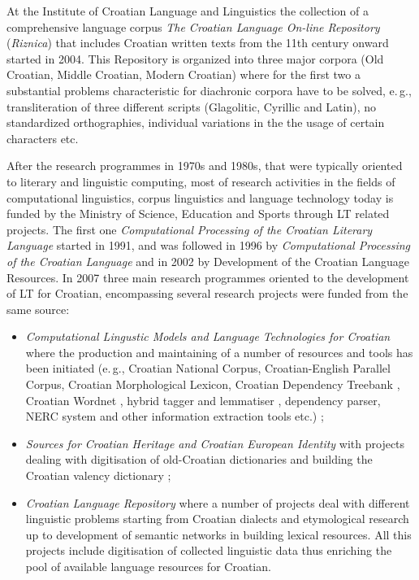 \begin{multicols}{2}
At the Institute of Croatian Language and Linguistics the collection of a comprehensive language corpus \emph{The Croatian Language On-line Repository} (\emph{Riznica})  \cite{str29, pro11} that includes Croatian written texts from the 11th century onward started in 2004. This Repository is organized into three major corpora (Old Croatian, Middle Croatian, Modern Croatian) where for the first two a substantial problems characteristic for diachronic corpora have to be solved, e.\,g., transliteration of three different scripts (Glagolitic, Cyrillic and Latin), no standardized orthographies, individual variations in the the usage of certain characters etc.

After the research programmes in 1970s and 1980s, that were typically oriented  to literary and linguistic computing, most of research activities in the fields of computational linguistics, corpus linguistics and language technology today is funded by the Ministry of Science, Education and Sports through LT related projects. The first one \emph{Computational Processing of the Croatian Literary Language} started in 1991, and was followed in 1996 by \emph{Computational Processing of the Croatian Language} and in 2002 by Development of the Croatian Language Resources. In 2007 three main research programmes oriented to the development of LT for Croatian, encompassing several research projects were funded from the same source:

\begin{itemize}
\item \emph{Computational Lingustic Models and Language Technologies for Croatian} \cite{str30} where the production and maintaining of a number of resources and tools has been initiated (e.\,g., Croatian National Corpus, Croatian-English Parallel Corpus, Croatian Morphological Lexicon, Croatian Dependency Treebank \cite{str31}, Croatian Wordnet \cite{str32}, hybrid tagger \cite{art8} and lemmatiser \cite{pro12}, dependency parser, NERC system and other information extraction tools \cite{str33} etc.) ;
\item \emph{Sources for Croatian Heritage and Croatian European Identity} \cite{str34} with projects dealing with digitisation of old-Croatian dictionaries and building the Croatian valency dictionary \cite{art9}; 
\item \emph{Croatian Language Repository} \cite{str29} where a number of projects deal with different linguistic problems starting from Croatian dialects and etymological research up to development of semantic networks in building lexical resources. All this projects include digitisation of collected linguistic data thus enriching the pool of available language resources for Croatian. 
\end{itemize}


\end{multicols}
